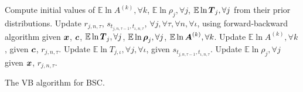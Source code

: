 \begin{algorithm}
\DontPrintSemicolon
 \nl Compute initial values of $\mathbb{E}\ln A^{(k)},\forall k$,
 $\mathbb{E}\ln \rho_j,\forall j$, 
 $\mathbb{E}\ln \boldsymbol T_j,\forall j$ 
 from their prior distributions.\;
 {
 \nl Update $r_{j,n,\tau}$, $s_{t_{j,n,\tau\!-\!1}, t_{\iota,n,\tau}}$, $\!\forall j,\!\forall \tau,\!\forall n,\!\forall \iota$,
 using forward-backward algorithm
 given $\boldsymbol x$, $\boldsymbol c$, $\mathbb{E}\ln \boldsymbol T_j,\forall j$,
 $\mathbb{E}\ln\boldsymbol\rho_j,\forall j$, 
  $\mathbb{E}\ln\boldsymbol A^{(k)},\forall k$.\;%
 \nl Update $\mathbb{E}\ln A^{(k)},\forall k$, 
 given $\boldsymbol c$, $r_{j,n,\tau}$.\;
 \nl Update $\mathbb{E}\ln T_{j,\iota},\forall j,\forall \iota$, 
 given $s_{t_{j,n,\tau\!-\!1}, t_{\iota,n,\tau}}$.\;
 \nl Update $\mathbb{E}\ln \rho_j,\forall j$ given $\boldsymbol x$, $r_{j,n,\tau}$.
 }
\;
\caption{The VB algorithm for BSC.}
\label{al:vb_bac}
\end{algorithm}

